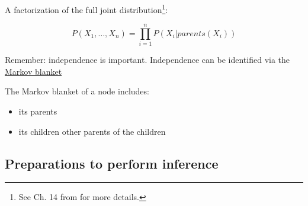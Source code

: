 
\begin{frame}\frametitle{\secname}
    
A factorization of the full joint distribution\footnote{See Ch. 14 from \citep{russell2016artificial} for more details.}:

\begin{equation}
P(X_{1},\ldots,X_{n}) = \prod_{i=1}^{n} P(X_{i} | parents(X_{i}))
\end{equation}
    
Remember: independence is important. Independence can be identified via the 
\underline{Markov blanket}

The Markov blanket of a node includes:
\begin{itemize}
\item its parents
\item its children
other parents of the children    
\end{itemize}
    
\end{frame}

\subsection{Preparations to perform inference}

